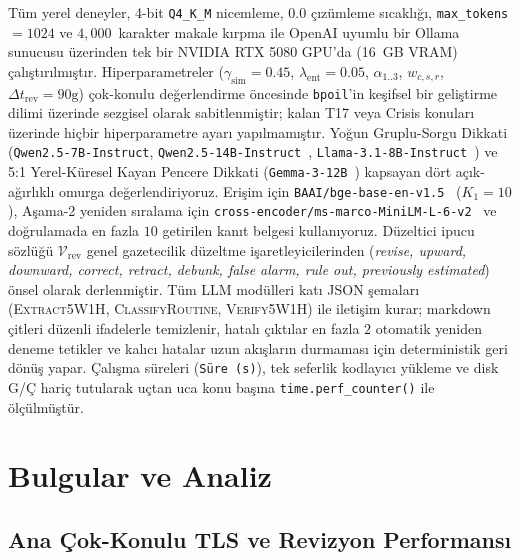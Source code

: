 ﻿\documentclass[journal]{IEEEtran}
\begin{document}
T\"{u}m yerel deneyler, 4-bit \texttt{Q4\_K\_M} nicemleme, $0.0$ \c{c}{\i}z\"{u}mleme s{\i}cakl{\i}\u{g}{\i}, \texttt{max\_tokens} $= 1024$ ve $4{,}000$~karakter makale k{\i}rpma ile OpenAI uyumlu bir Ollama sunucusu \"{u}zerinden tek bir NVIDIA RTX 5080 GPU'da (16~GB VRAM) \c{c}al{\i}\c{s}t{\i}r{\i}lm{\i}\c{s}t{\i}r. Hiperparametreler ($\gamma_{\text{sim}}=0.45$, $\lambda_{\text{ent}}=0.05$, $\alpha_{1..3}$, $w_{c,s,r}$, $\Delta t_{\text{rev}}=90\text{g}$) \c{c}ok-konulu de\u{g}erlendirme \"{o}ncesinde \texttt{bpoil}'in ke\c{s}ifsel bir geli\c{s}tirme dilimi \"{u}zerinde sezgisel olarak sabitlenmi\c{s}tir; kalan T17 veya Crisis konular{\i} \"{u}zerinde hi\c{c}bir hiperparametre ayar{\i} yap{\i}lmam{\i}\c{s}t{\i}r. Yo\u{g}un Gruplu-Sorgu Dikkati (\texttt{Qwen2.5-7B-Instruct}, \texttt{Qwen2.5-14B-Instruct}~\cite{qwen25}, \texttt{Llama-3.1-8B-Instruct}~\cite{llama3}) ve 5:1 Yerel-K\"{u}resel Kayan Pencere Dikkati (\texttt{Gemma-3-12B}~\cite{gemma3}) kapsayan d\"{o}rt a\c{c}{\i}k-a\u{g}{\i}rl{\i}kl{\i} omurga de\u{g}erlendiriyoruz. Eri\c{s}im i\c{c}in \texttt{BAAI/bge-base-en-v1.5}~\cite{xiao2024cpack} ($K_1 = 10$), A\c{s}ama-2 yeniden s{\i}ralama i\c{c}in \texttt{cross-encoder/ms-marco-MiniLM-L-6-v2}~\cite{wang2020minilm, nguyen2016msmarco} ve do\u{g}rulamada en fazla $10$ getirilen kan{\i}t belgesi kullan{\i}yoruz. D\"{u}zeltici ipucu s\"{o}zl\"{u}\u{g}\"{u} $\mathcal{V}_{\text{rev}}$ genel gazetecilik d\"{u}zeltme i\c{s}aretleyicilerinden (\textit{revise, upward, downward, correct, retract, debunk, false alarm, rule out, previously estimated}) \"{o}nsel olarak derlenmi\c{s}tir. T\"{u}m LLM mod\"{u}lleri kat{\i} JSON \c{s}emalar{\i} (\textsc{Extract5W1H}, \textsc{ClassifyRoutine}, \textsc{Verify5W1H}) ile ileti\c{s}im kurar; markdown \c{c}itleri d\"{u}zenli ifadelerle temizlenir, hatal{\i} \c{c}{\i}kt{\i}lar en fazla $2$ otomatik yeniden deneme tetikler ve kal{\i}c{\i} hatalar uzun ak{\i}\c{s}lar{\i}n durmamas{\i} i\c{c}in deterministik geri d\"{o}n\"{u}\c{s} yapar. \c{C}al{\i}\c{s}ma s\"{u}releri (\texttt{S\"{u}re (s)}), tek seferlik kodlay{\i}c{\i} y\"{u}kleme ve disk G/\c{C} hari\c{c} tutularak u\c{c}tan uca konu ba\c{s}{\i}na \texttt{time.perf\_counter()} ile \"{o}l\c{c}\"{u}lm\"{u}\c{s}t\"{u}r.

\section{Bulgular ve Analiz}
\label{sec:results}

\subsection{Ana \c{C}ok-Konulu TLS ve Revizyon Performans{\i}}
\label{subsec:main_results}
\end{document}
